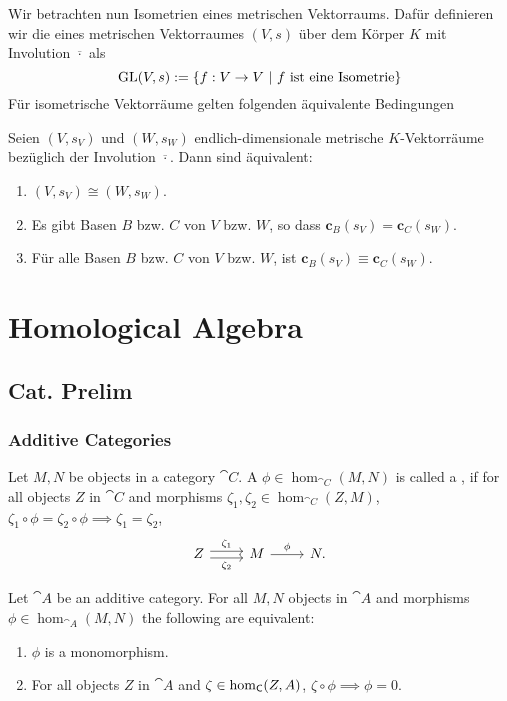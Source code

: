 \documentclass[11pt,twoside]{memoir}
\begin{document}
Wir betrachten nun Isometrien eines metrischen Vektorraums. Dafür definieren wir die  eines metrischen Vektorraumes $(V,s)$ über dem Körper $K$ mit Involution $\overline{\cdot}$ als
\[
\operatorname{GL}(V,s):= \{f:V\to V~|~ f~\text{ist eine Isometrie}\}
\]
Für isometrische Vektorräume gelten folgenden äquivalente Bedingungen
\begin{prop}
	Seien $(V,s_V)$ und $(W,s_W)$ endlich-dimensionale metrische $K$-Vektorräume bezüglich der Involution $\overline{\cdot}$. Dann sind äquivalent:
	\begin{enumerate}
		\item $(V,s_V)\cong (W,s_W)$.
		\item Es gibt Basen $B$ bzw. $C$ von $V$ bzw. $W$, so dass $\mathbf{c}_B(s_V) = \mathbf{c}_C(s_W)$.
		\item Für alle Basen $B$ bzw. $C$ von $V$ bzw. $W$, ist $\mathbf{c}_B(s_V) \equiv \mathbf{c}_C(s_W)$.
	\end{enumerate}
\end{prop}
\chapter{Homological Algebra}
\section{Cat. Prelim}
\subsection{Additive Categories}
\begin{defn}
	Let $M,N$ be objects in a category $\cat{C}$. A \morph $\phi\in \hom_{\cat{C}}(M,N)$ is called a , if for all objects $Z$ in $\cat{C}$ and morphisms $\zeta_1,\zeta_2\in \hom_{\cat{C}}(Z,M)$, $\zeta_1\circ\phi=\zeta_2\circ \phi\implies \zeta_1=\zeta_2$,
	\[
	\begin{tikzcd}
	Z\ar[shift left]{r}{\zeta_1}\ar[shift right,swap]{r}{\zeta_2}&M\ar{r}{\phi}&N.	\end{tikzcd}
	\]
\end{defn}	
\begin{lem}
	Let $\cat{A}$ be an additive category. For all $M,N$ objects in $\cat{A}$ and morphisms $\phi \in \hom_{\cat{A}}(M,N)$ the following are equivalent:
	\begin{enumerate}
		\item $\phi$ is a monomorphism.
		\item For all objects $Z$ in $\cat{A}$ and $\zeta \in \hom_{\mathsf{C}}(Z,A)$, $\zeta \circ \phi \implies \phi = 0$.
	\end{enumerate}
\end{lem}
\end{document}

